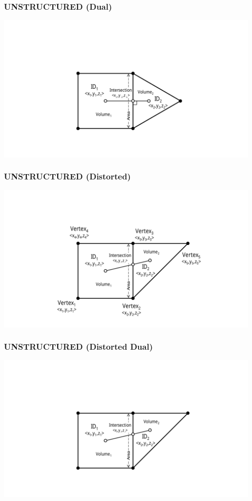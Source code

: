 \documentclass{beamer}
\begin{document}
\begin{frame}[fragile]\frametitle{UNSTRUCTURED (Dual)}
\vspace{0.2in}
\centering
\includegraphics[width=1\linewidth]{./fe_dual}
\end{frame}

\begin{frame}[fragile]\frametitle{UNSTRUCTURED (Distorted)}
\vspace{0.2in}
\centering
\includegraphics[width=1\linewidth]{./fe_distort_all}
\end{frame}

\begin{frame}[fragile]\frametitle{UNSTRUCTURED (Distorted Dual)}
\vspace{0.2in}
\centering
\includegraphics[width=1\linewidth]{./fe_distort_dual}
\end{frame}
\end{document}
